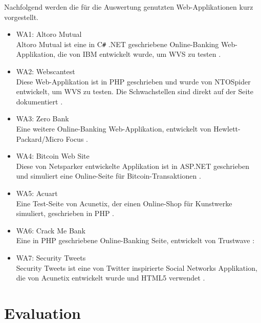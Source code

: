 \documentclass[12pt,oneside,a4paper,parskip]{scrbook}
\begin{document}
  Nachfolgend werden die für die Auswertung genutzten Web-Applikationen kurz vorgestellt.
  \begin{itemize}
    \item WA1: Altoro Mutual\\
    Altoro Mutual ist eine in C\texttt{\#} .NET geschriebene Online-Banking Web-Applikation, die von IBM entwickelt wurde, um WVS zu testen \cite{Altoro}.
    \item WA2: Webscantest\\
    Diese Web-Applikation ist in PHP geschrieben und wurde von NTOSpider entwickelt, um WVS zu testen. Die Schwachstellen sind direkt auf der Seite dokumentiert \cite{Webscantest}.
    \item WA3: Zero Bank\\
    Eine weitere Online-Banking Web-Applikation, entwickelt von Hewlett-Packard/Micro Focus \cite{Zero}.
    \item WA4: Bitcoin Web Site\\
    Diese von Netsparker entwickelte Applikation ist in ASP.NET geschrieben und simuliert eine Online-Seite für Bitcoin-Transaktionen \cite{Aspnet}.
    \item WA5: Acuart\\
    Eine Test-Seite von Acunetix, der einen Online-Shop für Kunstwerke simuliert, geschrieben in PHP \cite{Acuart}.
    \item WA6: Crack Me Bank\\
    Eine in PHP geschriebene Online-Banking Seite, entwickelt von Trustwave \cite{CrackMeBank}:
    \item WA7: Security Tweets\\
    Security Tweets ist eine von Twitter inspirierte Social Networks Applikation, die von Acunetix entwickelt wurde und HTML5 verwendet \cite{Tweets}.
 \end{itemize}
\chapter{Evaluation}
\end{document}
